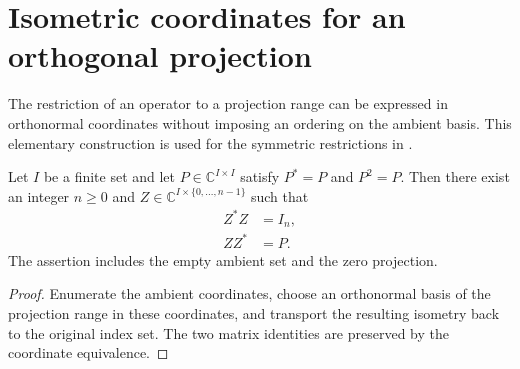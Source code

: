 \section{Isometric coordinates for an orthogonal projection}

The restriction of an operator to a projection range can be expressed in
orthonormal coordinates without imposing an ordering on the ambient basis.
This elementary construction is used for the symmetric restrictions in
\cite[Section~8, lines~80--110 and 370--381]{OpenAI2026AreaLaw}.

\begin{theorem}
    \label{thm:projection_range_isometry}
    \leanok
    Let $I$ be a finite set and let $P\in\mathbb C^{I\times I}$ satisfy
    $P^*=P$ and $P^2=P$. Then there exist an integer $n\ge0$ and
    $Z\in\mathbb C^{I\times\{0,\ldots,n-1\}}$ such that
    \begin{align*}
        Z^*Z & =I_n, \\
        ZZ^* & =P.
    \end{align*}
    The assertion includes the empty ambient set and the zero projection.
\end{theorem}

\begin{proof}
    \leanok
    Enumerate the ambient coordinates, choose an orthonormal basis of the
    projection range in these coordinates, and transport the resulting
    isometry back to the original index set. The two matrix identities are
    preserved by the coordinate equivalence.
\end{proof}
